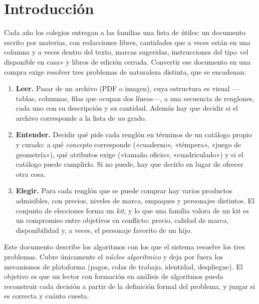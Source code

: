 \section{Introducción}
\label{sec:intro}

Cada año los colegios entregan a las familias una lista de útiles: un documento
escrito por materias, con redacciones libres, cantidades que a veces están en
una columna y a veces dentro del texto, marcas sugeridas, instrucciones del
tipo «el disponible en casa» y libros de edición cerrada. Convertir ese
documento en una compra exige resolver tres problemas de naturaleza distinta,
que se encadenan:

\begin{enumerate}
  \item \textbf{Leer.} Pasar de un archivo (PDF o imagen), cuya estructura es
        visual ---tablas, columnas, filas que ocupan dos líneas---, a una
        secuencia de renglones, cada uno con su descripción y su cantidad.
        Además hay que decidir si el archivo corresponde a la lista de
        \emph{un} grado.
  \item \textbf{Entender.} Decidir qué pide cada renglón en términos de un
        catálogo propio y curado: a qué \emph{concepto} corresponde
        («cuaderno», «témpera», «juego de geometría»), qué atributos exige
        («tamaño oficio», «cuadriculado») y si el catálogo puede cumplirlo.
        Si no puede, hay que decirlo en lugar de ofrecer otra cosa.
  \item \textbf{Elegir.} Para cada renglón que se puede comprar hay varios
        productos admisibles, con precios, niveles de marca, empaques y
        personajes distintos. El conjunto de elecciones forma un \emph{kit}, y
        lo que una familia valora de un kit es un compromiso entre objetivos
        en conflicto: precio, calidad de marca, disponibilidad y, a veces, el
        personaje favorito de un hijo.
\end{enumerate}

Este documento describe los algoritmos con los que el sistema resuelve los
tres problemas. Cubre únicamente el \emph{núcleo algorítmico} y deja por fuera
los mecanismos de plataforma (pagos, colas de trabajo, identidad, despliegue).
El objetivo es que un lector con formación en análisis de algoritmos pueda
reconstruir cada decisión a partir de la definición formal del problema, y
juzgar si es correcta y cuánto cuesta.

